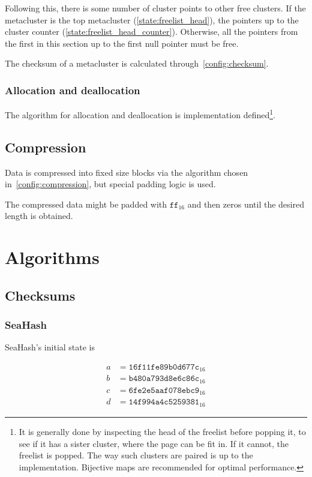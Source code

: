 \documentclass[11pt,a4paper]{report}
\begin{document}
        Following this, there is some number of cluster points to other free
        clusters. If the metacluster is the top metacluster
        (\ref{state:freelist_head}), the pointers up to the cluster counter
        (\ref{state:freelist_head_counter}). Otherwise, all the pointers from
        the first in this section up to the first null pointer must be free.

        The checksum of a metacluster is calculated
        through~\ref{config:checksum}.

        \subsection{Allocation and deallocation}
        The algorithm for allocation and deallocation is implementation
        defined\footnote{It is generally done by inspecting the head of the
        freelist before popping it, to see if it has a sister cluster,
        where the page can be fit in. If it cannot, the freelist is popped.
        The way such clusters are paired is up to the implementation.
        Bijective maps are recommended for optimal performance.}.

    \section{Compression}
    \label{cluster:compression}
        Data is compressed into fixed size blocks via the algorithm chosen
        in~\ref{config:compression}, but special padding logic is used.

        The compressed data might be padded with $\texttt{ff}_{16}$ and then
        zeros until the desired length is obtained.

    \chapter{Algorithms}

    \section{Checksums}
        \subsection{SeaHash}
        \label{algorithm:seahash}
        SeaHash's initial state is

        \begin{align*}
            a &= \texttt{16f11fe89b0d677c}_{16} \\
            b &= \texttt{b480a793d8e6c86c}_{16} \\
            c &= \texttt{6fe2e5aaf078ebc9}_{16} \\
            d &= \texttt{14f994a4c5259381}_{16}
        \end{align*}
\end{document}
